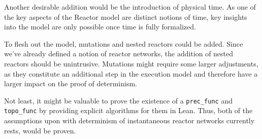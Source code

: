 Another desirable addition would be the introduction of physical time. 
As one of the key aspects of the Reactor model are distinct notions of time, key insights into the model are only possible once time is fully formalized.

To flesh out the model, mutations and nested reactors could be added.
Since we've already defined a notion of reactor networks, the addition of nested reactors should be unintrusive.
Mutations might require some larger adjustments, as they constitute an additional step in the execution model and therefore have a larger impact on the proof of determinism. 

Not least, it might be valuable to prove the existence of a \lstinline{prec_func} and \lstinline{topo_func} by providing explicit algorithms for them in Lean.
Thus, both of the assumptions upon with determinism of instantaneous reactor networks currently rests, would be proven.